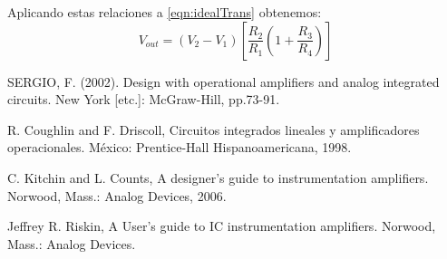 \documentclass[a4paper]{article}
\begin{document}
	Aplicando estas relaciones a \eqref{eqn:idealTrans} obtenemos:
	\begin{equation}
		V_{out} = (V_2-V_1)\left[\frac{R_2}{R_1}(1+\frac{R_3}{R_4})\right]
	\end{equation}
 	
	
\begin{thebibliography}{9}
	
	SERGIO, F. (2002). Design with operational amplifiers and analog integrated circuits. New York [etc.]: McGraw-Hill, pp.73-91.	
	
	R. Coughlin and F. Driscoll, Circuitos integrados lineales y amplificadores operacionales. México: Prentice-Hall Hispanoamericana, 1998.
	
	C. Kitchin and L. Counts, A designer's guide to instrumentation amplifiers. Norwood, Mass.: Analog Devices, 2006.
	
	Jeffrey R. Riskin, A User's guide to IC instrumentation amplifiers. Norwood, Mass.: Analog Devices.
	
\end{thebibliography}
\end{document}
